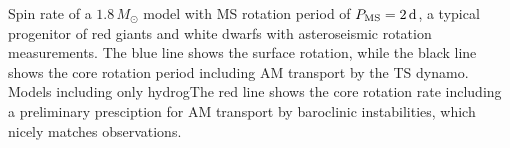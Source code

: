  \label{fig:MRI1p8rot} Spin rate of a $1.8 \, M_\odot$ model with MS rotation period of $P_{\rm MS} = 2 \, {\rm d}$, a typical progenitor of red giants and white dwarfs with asteroseismic rotation measurements. The blue line shows the surface rotation, while the black line shows the core rotation period including AM transport by the TS dynamo. Models including only hydrogThe red line shows the core rotation rate including a preliminary presciption for AM transport by baroclinic instabilities, which nicely matches observations.